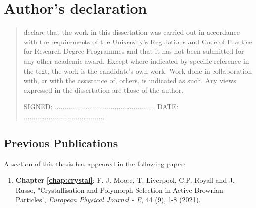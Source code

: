 %
%
%
%
%
%
\chapter*{Author's declaration}
\begin{SingleSpace}
\begin{quote}
 declare that the work in this dissertation was carried out in accordance with the requirements of  the University's Regulations and Code of Practice for Research Degree Programmes and that it  has not been submitted for any other academic award. Except where indicated by specific  reference in the text, the work is the candidate's own work. Work done in collaboration with, or with the assistance of, others, is indicated as such. Any views expressed in the dissertation are those of the author.

\vspace{1.5cm}
\noindent
\hspace{-0.75cm}\textsc{SIGNED: .................................................... DATE: ..........................................}
\end{quote}
\end{SingleSpace}
\clearpage



\section*{Previous Publications}


A section of this thesis has appeared in the following paper:


\begin{enumerate}
	\item \textbf{Chapter \ref{chap:crystal}}:   F. J. Moore, T. Liverpool, C.P. Royall and J. Russo, "Crystallisation and Polymorph Selection in Active Brownian Particles", \textit{European Physical Journal - E}, 44 (9), 1-8 (2021).
\end{enumerate}

